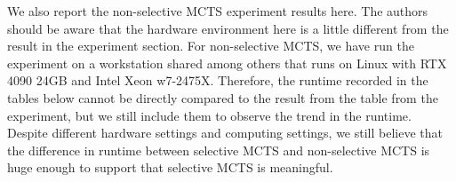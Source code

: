\documentclass{article}
\begin{document}
 We also report the non-selective MCTS experiment results here. The authors should be aware that the hardware environment here is a little different from the result in the experiment section. For non-selective MCTS, we have run the experiment on a workstation shared among others that runs on Linux with RTX 4090 24GB and Intel Xeon w7-2475X. Therefore, the runtime recorded in the tables below cannot be directly compared to the result from the table from the experiment, but we still include them to observe the trend in the runtime. Despite different hardware settings and computing settings, we still believe that the difference in runtime between selective MCTS and non-selective MCTS is huge enough to support that selective MCTS is meaningful.

\begin{table}[htbp]
  \centering
  \caption{Non-selective MCTS applied on TSP}
\end{table}
\end{document}
